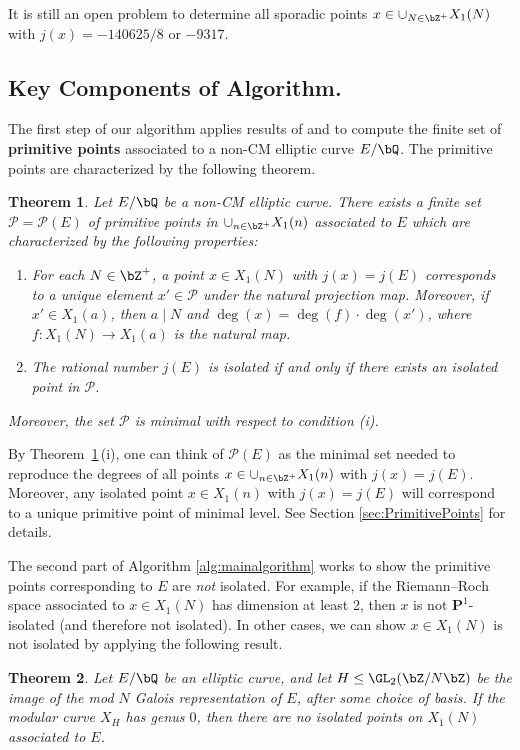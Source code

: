 \documentclass[11pt,reqno]{amsart}
\theoremstyle{plain}
\newtheorem{theorem}{Theorem}%
\theoremstyle{definition}
\newcommand{\Q}{\bQ}
\newcommand{\Z}{\bZ}
\newcommand{\PP}{\mathbf P}
\begin{document}
It is still an open problem to determine all sporadic points $x \in \cup_{N \in \Z^+} X_1(N)$ with $j(x) =-140625/8$ or $-9317$.

\subsection{Key Components of Algorithm.} The first step of our algorithm applies results of \cite{BELOV} and \cite{ZywinaAlgorithm} to compute the finite set of \textbf{primitive points} associated to a non-CM elliptic curve $E/\Q$. The primitive points are characterized by the following theorem. 
\begin{theorem}\label{Thm:PrimPtsIntro}
Let $E/\Q$ be a non-CM elliptic curve.  There exists a finite set $\mathcal{P}=\mathcal{P}(E)$ of primitive points in $\cup_{n \in \Z^+} X_1(n)$ associated to $E$ which are characterized by the following properties:
\begin{enumerate}
\item For each $N\in \Z^+$, a point $x \in X_1(N)$ with $j(x)=j(E)$ corresponds to a unique element $x' \in \mathcal{P}$ under the natural projection map. Moreover, if $x' \in X_1(a)$, then $a \mid N$ and $\deg(x)=\deg(f)\cdot \deg(x')$, where $f\colon X_1(N) \rightarrow X_1(a)$ is the natural map.
\item The rational number $j(E)$ is isolated if and only if there exists an isolated point in $\mathcal{P}$.
\end{enumerate}
Moreover, the set $\mathcal{P}$ is minimal with respect to condition (i).
\end{theorem} 

\noindent By Theorem~\ref{Thm:PrimPtsIntro}\,(i), one can think of $\mathcal{P}(E)$ as the minimal set needed to reproduce the degrees of all points $x \in \cup_{n \in \Z^+} X_1(n)$ with $j(x) = j(E)$. Moreover, any isolated point $x \in X_1(n)$ with $j(x)=j(E)$ will correspond to a unique primitive point of minimal level. See Section \ref{sec:PrimitivePoints} for details.

The second part of Algorithm \ref{alg:mainalgorithm} works to show the primitive points corresponding to $E$ are \emph{not} isolated. For example, if the Riemann--Roch space associated to $x \in X_1(N)$ has dimension at least 2, then $x$ is not $\PP^1$-isolated (and therefore not isolated). In other cases, we can show $x \in X_1(N)$ is not isolated by applying the following result.

\begin{theorem}\label{Prop:Genus0Intro}
Let $E/\Q$ be an elliptic curve, and let $H \leq \GL_2(\Z/N\Z)$ be the image of the mod $N$ Galois representation of $E$, after some choice of basis. If the modular curve $X_H$ has genus $0$, then there are no isolated points on $X_1(N)$ associated to $E$.
\end{theorem}
\end{document}
